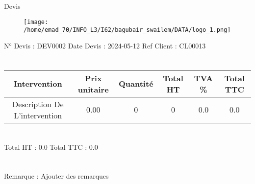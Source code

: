 \documentclass{article}%
\begin{document}
%
\normalsize%
\begin{Center}%
Devis \newline%
%
\end{Center}%
\begin{minipage}{0.5\textwidth}%
\begin{flushleft}%


\begin{figure}[h!]%
\centering%
\texttt{[image: /home/emad\_70/INFO\_L3/I62/bagubair\_swailem/DATA/logo\_1.png]}%
\end{figure}

%
\end{flushleft}%
\end{minipage}%
\begin{minipage}{0.5\textwidth}%
\begin{flushright}%
N° Devis : DEV0002\newline%
%
Date Devis : 2024{-}05{-}12\newline%
%
Ref Client : CL00013\newline%
%
\end{flushright}%
\end{minipage}%
\section*{}%
\label{sec:}%
\begin{tabular}{|c|c|c|c|c|c|}%
\hline%
Intervention&Prix unitaire&Quantité&Total HT&TVA \%&Total TTC\\%
\hline%
Description De L'intervention&0.00&0&0&0.0&0.0\\%
\hline%
\end{tabular}

%
\section*{}%
\label{sec:}%
\begin{flushright}%
\newline%
%
\newline%
%
Total HT : 0.0\newline%
%
Total TTC : 0.0\newline%
%
\newline%
%
\newline%
%
\end{flushright}

%
\section*{}%
\label{sec:}%
Remarque : \newline%
%
Ajouter des remarques\newline%

%
\newline%
%
\end{document}
